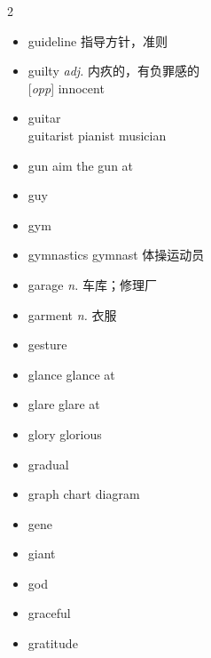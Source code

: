 \documentclass[../../book.tex]{subfiles}
\begin{document}
\begin{multicols}{2}
\begin{itemize}
\\\emph{n.} \textcircled{1} 导游 \textcircled{2} 指南 a guide to sp
\item[-] guideline 指导方针，准则
\item[-] guilty \emph{adj.} 内疚的，有负罪感的
\\{}[\emph{opp}] innocent
\item[-] guitar
\\guitarist pianist musician
\item[-] gun \phantom{a} aim the gun at
\item[-] guy
\item[-] gym
\item[-] gymnastics \phantom{a} gymnast 体操运动员
\item[-] garage \emph{n.} 车库；修理厂
\item[-] garment \emph{n.} 衣服
\item[-] gesture
\item[-] glance \phantom{a} glance at
\item[-] glare \phantom{a} glare at
\item[-] glory \phantom{a} glorious
\item[-] gradual
\item[-] graph \phantom{a} chart diagram
\item[-] gene
\item[-] giant
\item[-] god
\item[-] graceful
\item[-] gratitude
\end{itemize}
\end{multicols}
\end{document}
